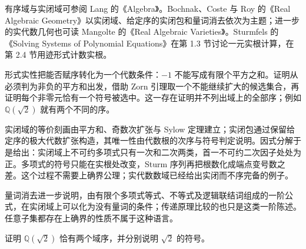 \ProseParagraphBreak
有序域与实闭域可参阅 Lang 的《Algebra》\cite[Chapter XI, \S\S 1--2]{Lang2002}。Bochnak、Coste 与 Roy 的《Real Algebraic Geometry》以实闭域、给定序的实闭包和量词消去依次为主题\cite[Sections 1.2--1.4]{BochnakCosteRoy1998RealAG}；进一步的实代数几何也可读 Mangolte 的《Real Algebraic Varieties》\cite[Section B.2; Chapter 2]{Mangolte2020RealAlgebraicVarieties}。Sturmfels 的《Solving Systems of Polynomial Equations》在第 1.3 节讨论一元实根计算，在第 2.4 节用迹形式计数实根\cite[Sections 1.3, 2.4]{Sturmfels2002PolynomialEquations}。

%
%





\begin{chaptersummary}
	形式实性把能否赋序转化为一个代数条件：\(-1\) 不能写成有限个平方之和。证明从必须判为非负的平方和出发，借助 Zorn 引理取一个不能继续扩大的候选集合，再证明每个非零元恰有一个符号被选中。这一存在证明并不列出域上的全部序；例如 \(\mathbb Q(\sqrt2)\) 就有两个不同的序。

	\ProseParagraphBreak
	实闭域的等价刻画由平方和、奇数次扩张与 Sylow 定理建立；实闭包通过保留给定序的极大代数扩张构造，其唯一性由代数根的次序与符号判定说明。因式分解于是给出：实闭域上不可约多项式只有一次和二次两类，首一不可约二次因子处处为正。多项式的符号只能在实根处改变，Sturm 序列再把根数化成端点变号数之差。这个过程不需要上确界公理；实代数数域已经给出实闭而不序完备的例子。

	\ProseParagraphBreak
	量词消去进一步说明，由有限个多项式等式、不等式及逻辑联结词组成的一阶公式，在实闭域上可以化为没有量词的条件；传递原理比较的也只是这类一阶陈述。任意子集都存在上确界的性质不属于这种语言。
\end{chaptersummary}

\BookExercises

\begin{exercise}\label{b1:ex:E-two-orders}
	证明 \(\mathbb Q(\sqrt2)\) 恰有两个域序，并分别说明 \(\sqrt2\) 的符号。
\end{exercise}

